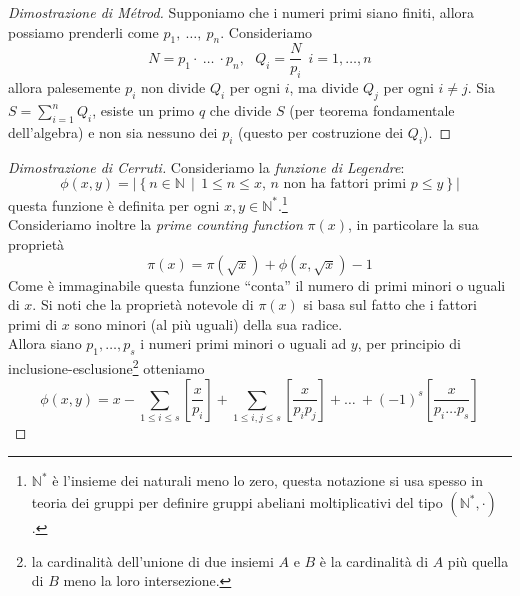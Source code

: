 \begin{proof}[Dimostrazione di Métrod] 
	Supponiamo che i numeri primi siano finiti, allora possiamo prenderli come $p_1, \ \dots, \ p_n$. Consideriamo
	\begin{equation*}
	N = p_1 \cdot \ \dots \ \cdot p_n, \ \ \ Q_i = \frac{N}{p_i} \ \ i=1,\dots,n
	\end{equation*}
	allora palesemente $p_i$ non divide $Q_i$ per ogni $i$, ma divide $Q_j$ per ogni $i\neq j$. Sia $S=\sum_{i=1}^nQ_i$, esiste un primo $q$ che divide $S$ (per teorema fondamentale dell'algebra) e non sia nessuno dei $p_i$ (questo per costruzione dei $Q_i$).
\end{proof}
\begin{proof}[Dimostrazione di Cerruti] 
	Consideriamo la \textit{funzione di Legendre}: 
	\begin{equation*}
	\phi(x,y)=\left|\left\{n\in \mathbb{N} \, \middle| \, \text{$1\leq n \leq x$, $n$ non ha fattori primi $p\leq y$}  \right\}\right|
	\end{equation*}
	questa funzione è definita per ogni $x,y \in \mathbb{N}^*$.\footnote{$\mathbb{N}^*$ è l'insieme dei naturali meno lo zero, questa notazione si usa spesso in teoria dei gruppi per definire gruppi abeliani moltiplicativi del tipo $(\mathbb{N}^*, \cdot)$.}
	\\ Consideriamo inoltre la \textit{prime counting function} $\pi(x)$, in particolare la sua proprietà
	\begin{equation*}
	\pi(x)=\pi(\sqrt{x})+\phi(x,\sqrt{x})-1
	\end{equation*}
	Come è immaginabile questa funzione \enquote{conta} il numero di primi minori o uguali di $x$. Si noti che la proprietà notevole di $\pi(x)$ si basa sul fatto che i fattori primi di $x$ sono minori (al più uguali) della sua radice. \\ Allora siano $p_1,\dots, p_s$ i numeri primi minori o uguali ad $y$, per principio di inclusione-esclusione\footnote{la cardinalità dell'unione di due insiemi $A$ e $B$ è la cardinalità di $A$ più quella di $B$ meno la loro intersezione.} otteniamo
	\begin{equation*}
	\phi(x,y)=x-\sum_{1\leq i \leq s}\left[\frac{x}{p_i}\right]+\sum_{1\leq i,j \leq s}\left[\frac{x}{p_ip_j}\right]+ \dots \ + (-1)^s\left[\frac{x}{p_i\dots p_s}\right]
	\end{equation*}

\end{proof}
